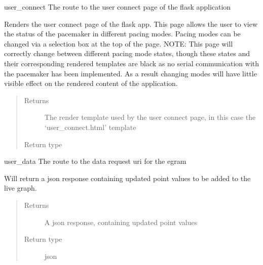 \documentclass[letterpaper,10pt,english]{sphinxmanual}
\begin{document}
\begin{fulllineitems}
\label{\detokenize{index:app.user_connect}}
user\_connect The route to the user connect page of the flask application

Renders the user connect page of the flask app. This page allows the user to
view the status of the pacemaker in different pacing modes. Pacing modes can
be changed via a selection box at the top of the page. NOTE: This page will
correctly change between different pacing mode states, though these states
and their corresponding rendered templates are black as no serial communication
with the pacemaker has been implemented. As a result changing modes will have little
visible effect on the rendered content of the application.
\begin{quote}\begin{description}
\item[{Returns}] \leavevmode
The render template used by the user connect page, in this case the ‘user\_connect.html’ template

\item[{Return type}] \leavevmode
{}

\end{description}\end{quote}

\end{fulllineitems}


\begin{fulllineitems}
\label{\detokenize{index:app.user_data}}
user\_data The route to the data request uri for the egram

Will return a json response containing updated point values to
be added to the live graph.
\begin{quote}\begin{description}
\item[{Returns}] \leavevmode
A json response, containing updated point values

\item[{Return type}] \leavevmode
json

\end{description}\end{quote}

\end{fulllineitems}
\end{document}
